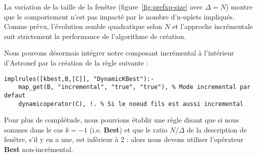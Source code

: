 La variation de la taille de la fenêtre (figure~\ref{fig:prefxp-size} avec $\Delta=N$) montre que le comportement n'est pas impacté par le nombre d'n-uplets impliqués. Comme prévu, l'évolution semble quadratique selon $N$ et l'approche incrémentale suit strictement la performance de l'algorithme de création.

Nous pouvons désormais intégrer notre composant incrémental à l'intérieur d'Astronef par la création de la règle suivante :
\begin{lstlisting}[language=PrologAstral]
implrules([kbest,B,[C]], "DynamicKBest"):- 
    map_get(B, "incremental", "true", "true"), % Mode incremental par defaut
    dynamicoperator(C), !. % Si le noeud fils est aussi incremental
\end{lstlisting}
Pour plus de complétude, nous pourrions établir une règle disant que si nous sommes dans le cas $k=-1$ (i.e. \textbf{Best}) et que le ratio $N/\Delta$ de la description de fenêtre, s'il y en a une, est inférieur à 2 : alors nous devons utiliser l'opérateur \textbf{Best} non-incrémental.
